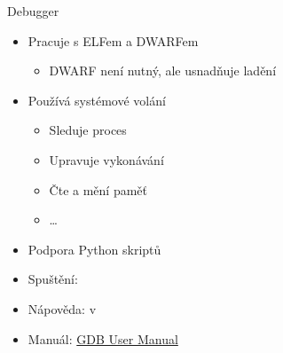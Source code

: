 
\begin{frame}{Debugger }

  \begin{itemize}
    \item Pracuje s ELFem a DWARFem
    \begin{itemize}
      \item DWARF není nutný, ale usnadňuje ladění
    \end{itemize}

    \pause

    \item Používá systémové volání 
    \begin{itemize}
      \item Sleduje proces
      \item Upravuje vykonávání
      \item Čte a mění paměť
      \item \dots
    \end{itemize}

    \pause

    \item Podpora Python skriptů
    \item Spuštění: 
    \item Nápověda:  v 
    \item Manuál: \href{https://sourceware.org/gdb/current/onlinedocs/gdb/}{GDB
      User Manual}
  \end{itemize}

\end{frame}

